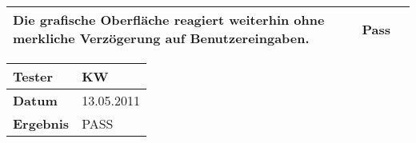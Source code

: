 \begin{table}[h]
\begin{center}
\begin{tabular}{|p{4cm}|p{7.8cm}|p{2.3cm}|}
                    Die grafische Oberfläche reagiert weiterhin ohne merkliche
                    Verzögerung auf Benutzereingaben.& Pass\\
                \hline
            \end{tabular}
                   \begin{tabular}{|p{3.5cm}|p{11cm}|}
                \textbf{Tester} & KW\\
                \hline
                \textbf{Datum} & 13.05.2011\\
                \hline
                \textbf{Ergebnis} & PASS\\
                \hline
            \end{tabular}
        \end{center}
    \end{table}

